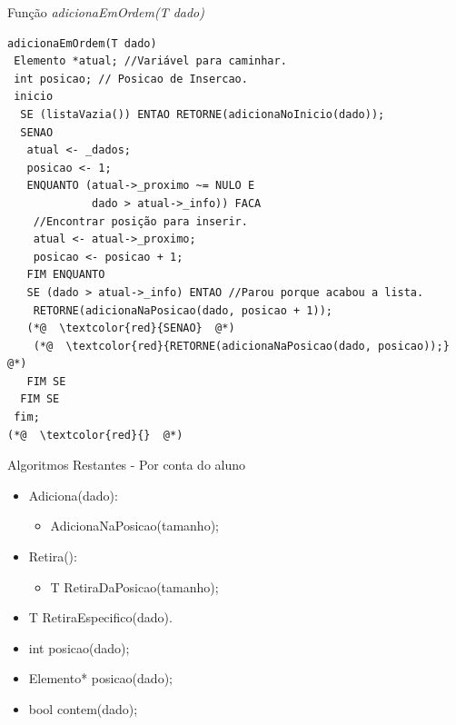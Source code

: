 \documentclass[12pt,table,xcolor={dvipsnames}]{beamer}
\begin{document}
\begin{frame}[fragile]{Função \textit{adicionaEmOrdem(T dado)}}
\begin{lstlisting}
adicionaEmOrdem(T dado)
 Elemento *atual; //Variável para caminhar.
 int posicao; // Posicao de Insercao.
 inicio
  SE (listaVazia()) ENTAO RETORNE(adicionaNoInicio(dado));
  SENAO
   atual <- _dados;
   posicao <- 1;
   ENQUANTO (atual->_proximo ~= NULO E
             dado > atual->_info)) FACA 
    //Encontrar posição para inserir.
    atual <- atual->_proximo;
    posicao <- posicao + 1;
   FIM ENQUANTO
   SE (dado > atual->_info) ENTAO //Parou porque acabou a lista.
    RETORNE(adicionaNaPosicao(dado, posicao + 1));
   (*@  \textcolor{red}{SENAO}  @*)
    (*@  \textcolor{red}{RETORNE(adicionaNaPosicao(dado, posicao));}  @*)
   FIM SE
  FIM SE
 fim;
(*@  \textcolor{red}{}  @*)
\end{lstlisting}
\end{frame}

\begin{frame}[fragile]{Algoritmos Restantes - Por conta do aluno}
\begin{itemize}
\item Adiciona(dado):
\begin{itemize}
\item AdicionaNaPosicao(tamanho);
\end{itemize}
\item Retira():
\begin{itemize}
\item T RetiraDaPosicao(tamanho);
\end{itemize}
\item T RetiraEspecifico(dado).
\item int posicao(dado);
\item Elemento* posicao(dado);
\item bool contem(dado);
\end{itemize}
\end{frame}
\end{document}
